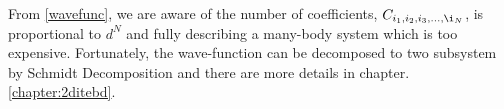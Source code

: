 From \ref{wavefunc}, we are aware of the number of coefficients, $C_{i_1,i_2,i_3,\ldots,\i_N}$, is proportional to $d^N$ and fully describing a many-body system which is too expensive. Fortunately, the wave-function can be decomposed to two subsystem by Schmidt Decomposition and there are more details in chapter.\ref{chapter:2ditebd}. 



